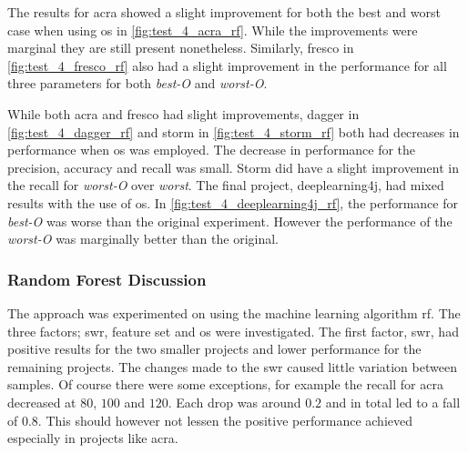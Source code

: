 The results for acra showed a slight improvement for both the best and worst case when using \gls{os} in \autoref{fig:test_4_acra_rf}. While the improvements were marginal they are still present nonetheless. Similarly, fresco in \autoref{fig:test_4_fresco_rf} also had a slight improvement in the performance for all three parameters for both \textit{best-O} and \textit{worst-O}.

While both acra and fresco had slight improvements, dagger in \autoref{fig:test_4_dagger_rf} and storm in \autoref{fig:test_4_storm_rf} both had decreases in performance when \gls{os} was employed. The decrease in performance for the precision, accuracy and recall was small. Storm did have a slight improvement in the recall for \textit{worst-O} over \textit{worst}. The final project, deeplearning4j, had mixed results with the use of \gls{os}. In \autoref{fig:test_4_deeplearning4j_rf}, the performance for \textit{best-O} was worse than the original experiment. However the performance of the \textit{worst-O} was marginally better than the original.

\subsubsection{Random Forest Discussion}
\label{subsec:rf_discussion}

The approach was experimented on using the machine learning algorithm \gls{rf}. The three factors; \gls{swr}, feature set and \gls{os} were investigated. The first factor, \gls{swr}, had positive results for the two smaller projects and lower performance for the remaining projects. The changes made to the \gls{swr} caused little variation between samples. Of course there were some exceptions, for example the recall for acra decreased at $80$, $100$ and $120$. Each drop was around $0.2$ and in total led to a fall of $0.8$. This should however not lessen the positive performance achieved especially in projects like acra.

